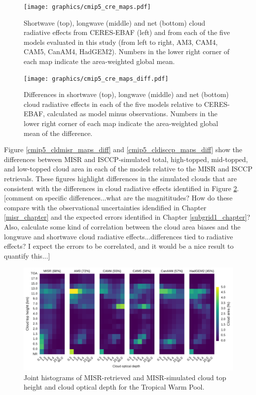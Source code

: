 \begin{figure}
\centering
\texttt{[image: graphics/cmip5\_cre\_maps.pdf]}
\caption{Shortwave (top), longwave (middle) and net (bottom) cloud radiative effects from CERES-EBAF (left) and from each of the five models evaluated in this study (from left to right, AM3, CAM4, CAM5, CanAM4, HadGEM2). Numbers in the lower right corner of each map indicate the area-weighted global mean.}
\label{cmip5_cre_maps}
\end{figure}

\begin{figure}
\centering
\texttt{[image: graphics/cmip5\_cre\_maps\_diff.pdf]}
\caption{Differences in shortwave (top), longwave (middle) and net (bottom) cloud radiative effects in each of the five models relative to CERES-EBAF, calculated as model minus observations. Numbers in the lower right corner of each map indicate the area-weighted global mean of the difference.}
\label{cmip5_cre_maps_diff}
\end{figure}

Figure \ref{cmip5_cldmisr_maps_diff} and \ref{cmip5_cldisccp_maps_diff} show the differences between MISR and ISCCP-simulated total, high-topped, mid-topped, and low-topped cloud area in each of the models relative to the MISR and ISCCP retrievals. These figures highlight differences in the simulated clouds that are consistent with the differences in cloud radiative effects identified in Figure \ref{cmip5_cre_maps_diff}. [comment on specific differences...what are the magnititudes? How do these compare with the observational uncertainties idendified in Chapter \ref{misr_chapter} and the expected errors identified in Chapter \ref{subgrid1_chapter}? Also, calculate some kind of correlation between the cloud area biases and the longwave and shortwave cloud radiative effects...differences tied to radiative effects? I expect the errors to be correlated, and it would be a nice result to quantify this...]

\begin{figure}
\centering
\includegraphics[width=\columnwidth]{graphics/cmip5_clMISR_TropicalWarmPool.pdf}
\caption{Joint histograms of MISR-retrieved and MISR-simulated cloud top height and cloud optical depth for the Tropical Warm Pool.}
\label{cmip5_clMISR_TropicalWarmPool}
\end{figure}

